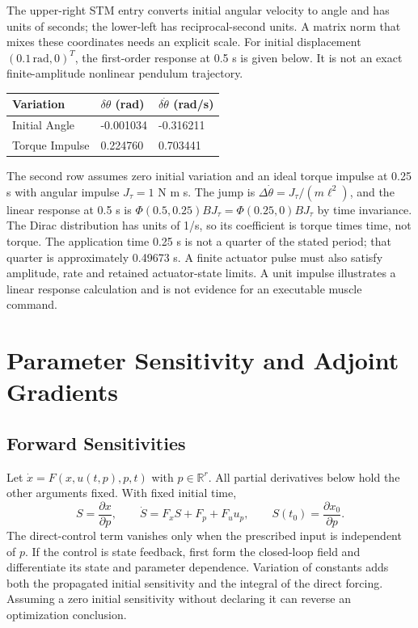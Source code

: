 The upper-right STM entry converts initial angular velocity to angle and has units of seconds; the lower-left has reciprocal-second units. A matrix norm that mixes these coordinates needs an explicit scale. For initial displacement $(0.1\,\mathrm{rad},0)^T$, the first-order response at 0.5 s is given below. It is not an exact finite-amplitude nonlinear pendulum trajectory.

\begin{center}
\small
\begin{tabular}{lll}
\toprule
Variation & $\delta\theta$ (rad) & $\delta\dot\theta$ (rad/s) \\
\midrule
Initial Angle & -0.001034 & -0.316211 \\
Torque Impulse & 0.224760 & 0.703441 \\
\bottomrule
\end{tabular}
\end{center}

The second row assumes zero initial variation and an ideal torque impulse at 0.25 s with angular impulse $J_\tau=1$ N m s. The jump is $\Delta\dot\theta=J_\tau/(m\ell^2)$, and the linear response at 0.5 s is $\Phi(0.5,0.25)BJ_\tau=\Phi(0.25,0)BJ_\tau$ by time invariance. The Dirac distribution has units of 1/s, so its coefficient is torque times time, not torque. The application time 0.25 s is not a quarter of the stated period; that quarter is approximately 0.49673 s. A finite actuator pulse must also satisfy amplitude, rate and retained actuator-state limits. A unit impulse illustrates a linear response calculation and is not evidence for an executable muscle command.

\section{Parameter Sensitivity and Adjoint Gradients}

\subsection{Forward Sensitivities}

Let $\dot x=F(x,u(t,p),p,t)$ with $p\in\mathbb R^r$. All partial derivatives below hold the other arguments fixed. With fixed initial time,
\begin{equation}
S=\frac{\partial x}{\partial p},\qquad
\dot S=F_x S+F_p+F_u u_p,\qquad S(t_0)=\frac{\partial x_0}{\partial p}.
\end{equation}
The direct-control term vanishes only when the prescribed input is independent of $p$. If the control is state feedback, first form the closed-loop field and differentiate its state and parameter dependence. Variation of constants adds both the propagated initial sensitivity and the integral of the direct forcing. Assuming a zero initial sensitivity without declaring it can reverse an optimization conclusion.

